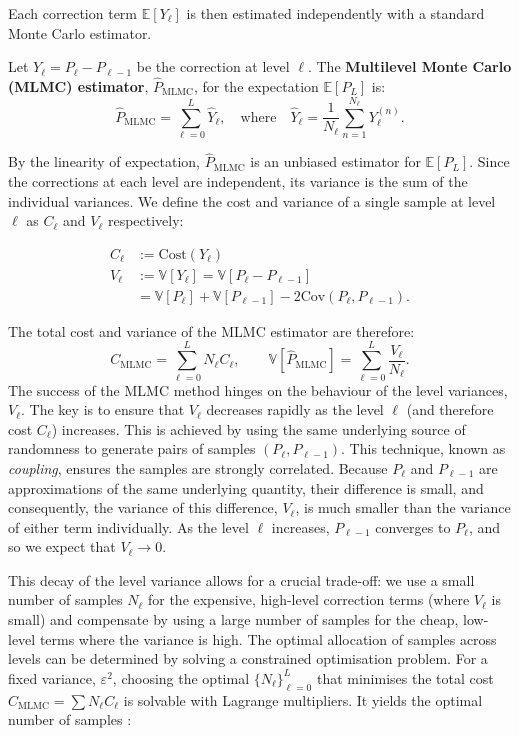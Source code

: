 Each correction term $\mathbb{E}[Y_\ell]$ is then estimated independently with a 
standard Monte Carlo estimator.

\begin{definition}\label{def:mlmc_estimator}
    Let $Y_\ell = P_\ell - P_{\ell-1}$ be the correction at level $\ell$. The \textbf{Multilevel Monte Carlo (MLMC) estimator}, $\hat{P}_{\mathrm{MLMC}}$, for the expectation $\mathbb{E}[P_L]$ is:
    \[
    \hat{P}_{\mathrm{MLMC}} = \sum_{\ell=0}^L \hat{Y}_\ell, \quad \text{where} \quad \hat{Y}_\ell = \frac{1}{N_\ell} \sum_{n=1}^{N_\ell} Y_\ell^{(n)}.
    \]
\end{definition}


By the linearity of expectation, $\hat{P}_{\mathrm{MLMC}}$ is an unbiased estimator for 
$\mathbb{E}[P_L]$. Since the corrections at each level are independent, its variance is the sum 
of the individual variances. We define the cost and variance of a single sample at 
level $\ell$ as $C_\ell$ and $V_\ell$ respectively:

\begin{align*}
    C_\ell &:= \text{Cost}(Y_\ell) \\
    V_\ell &:= \mathbb{V}[Y_\ell] = \mathbb{V}[P_\ell - P_{\ell-1}] \\
    &= \mathbb{V}[P_\ell] + \mathbb{V}[P_{\ell - 1}]  - 2 \mathrm{Cov}(P_\ell, P_{\ell - 1}).
\end{align*}

The total cost and variance of the MLMC estimator are therefore:
$$
C_{\mathrm{MLMC}} = \sum_{\ell=0}^L N_\ell C_\ell, \qquad 
\mathbb{V}[\hat{P}_{\mathrm{MLMC}}] = \sum_{\ell=0}^L \frac{V_\ell}{N_\ell}.
$$
The success of the MLMC method hinges on the behaviour of the level variances, 
$V_\ell$. The key is to ensure that $V_\ell$ decreases rapidly as the level $\ell$ 
(and therefore cost $C_\ell$) increases. This is achieved by using the same underlying source of 
randomness to generate pairs of samples $(P_\ell, P_{\ell-1})$. This technique, known as
\textit{coupling}, ensures the samples are strongly correlated. Because 
$P_\ell$ and $P_{\ell - 1}$ are approximations of the same underlying quantity, their difference 
is small, and consequently, the variance of this difference, $V_\ell$, is much smaller than the 
variance of either term individually. As the level $\ell$ increases, $P_{\ell-1}$ converges to 
$P_{\ell}$, and so we expect that $V_\ell \to 0$.

This decay of the level variance allows for a crucial trade-off: we use a small number 
of samples $N_\ell$ for the expensive, high-level correction terms 
(where $V_\ell$ is small) and compensate by using a large number of samples 
for the cheap, low-level terms where the variance is high. The optimal allocation 
of samples across levels can be determined by solving a constrained optimisation problem.
For a fixed variance, $\varepsilon^2$, choosing the optimal $\{N_\ell\}_{\ell=0}^L$ that 
minimises the total cost $C_{\textrm{MLMC}} = \sum N_\ell C_\ell$ is solvable with 
Lagrange multipliers. It yields the optimal number of samples \cite{giles2015multilevel}:

